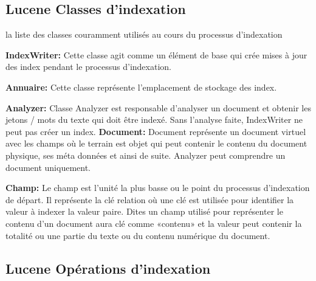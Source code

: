 \documentclass[12pt]{report}
\begin{document}
\subsection{Lucene Classes d'indexation}

	\begin{frame}
\newline
	 la liste des classes couramment utilisés au cours du processus d'indexation\newline
	 
		\textbf{IndexWriter:}
		\newline
Cette classe agit comme un élément de base qui crée mises à jour des index pendant le processus d'indexation.
		\newline
		
		\textbf{Annuaire:}\newline
Cette classe représente l'emplacement de stockage des index.
\newline

\textbf{Analyzer:}\newline
Classe Analyzer est responsable d'analyser un document et obtenir les jetons / mots du texte qui doit être indexé. Sans l'analyse faite, IndexWriter ne peut pas créer un index.
\newline
\newpage
\textbf{Document:}\newline
Document représente un document virtuel avec les champs où le terrain est objet qui peut contenir le contenu du document physique, ses méta données et ainsi de suite. Analyzer peut comprendre un document uniquement.
\newline

\textbf{Champ:}\newline
 Le champ est l'unité la plus basse ou le point du processus d'indexation de départ. Il représente la clé relation où une clé est utilisée pour identifier la valeur à indexer la valeur paire. Dites un champ utilisé pour représenter le contenu d'un document aura clé comme «contenu» et la valeur peut contenir la totalité ou une partie du texte ou du contenu numérique du document.	

      
		\end{frame}
\subsection{Lucene Opérations d'indexation}
\end{document}
